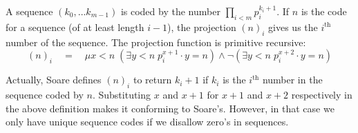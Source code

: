 \documentclass[a4paper,11pt]{article}
\begin{document}
\begin{enumerate}
A sequence $(k_0, \ldots k_{m\!-\!1})$ is coded by the number $\prod_{i<m} p_i^{k_i+1}$.
If $n$ is the code for a sequence (of at least length $i-1$), the projection
$(n)_i$ gives us the $i^\text{th}$ number of the sequence.
The projection function is primitive recursive:
\begin{equation*}
  (n)_i \quad = \quad \mu x \! < \! n \; ( \exists y \! < \! n \; p_i^{x+1} \cdot y = n ) \wedge \neg ( \exists y \! < \! n \; p_i^{x+2} \cdot y = n )
\end{equation*}

Actually, Soare defines $(n)_i$ to return $k_i+1$ if $k_i$ is
the $i^{\text{th}}$ number in the sequence coded by $n$. Substituting $x$ and
$x+1$ for $x+1$ and $x+2$ respectively in the above definition makes it
conforming to Soare's. However, in that case we only have unique
sequence codes if we disallow zero's in sequences.


\end{enumerate}
\end{document}
